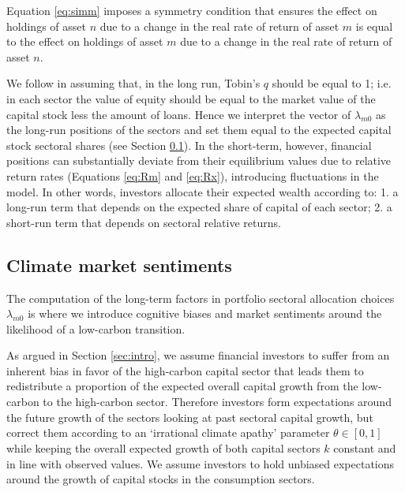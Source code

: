 \documentclass[authoryear]{article}
\begin{document}
Equation \ref{eq:simm} imposes a symmetry condition that ensures the effect on holdings of asset $n$ due to a change in the real rate of return of asset $m$ is equal to the effect on holdings of asset $m$ due to a change in the real rate of return of asset $n$.
			
We follow \citet{Tobin1969} in assuming that, in the long run, Tobin's $q$ should be equal to 1; i.e. in each sector the value of equity should be equal to the market value of the capital stock less the amount of loans. Hence we interpret the vector of $\lambda_{m0}$ as the long-run positions of the sectors and set them equal to the expected capital stock sectoral shares (see Section \ref{sec:exp}). In the short-term, however, financial positions can substantially deviate from their equilibrium values due to relative return rates (Equations \ref{eq:Rm} and \ref{eq:Rx}), introducing fluctuations in the model. In other words, investors allocate their expected wealth according to: 1. a long-run term that depends on the expected share of capital of each sector; 2. a short-run term that depends on sectoral relative returns. 


\subsection{Climate market sentiments}
\label{sec:exp}

The computation of the long-term factors in portfolio sectoral allocation choices $\lambda_{m0}$ is where we introduce cognitive biases and market sentiments around the likelihood of a low-carbon transition. 

As argued in Section \ref{sec:intro}, we assume financial investors to suffer from an inherent bias in favor of the high-carbon capital sector that leads them to redistribute a proportion of the expected overall capital growth from the low-carbon to the high-carbon sector. Therefore investors form expectations around the future growth of the sectors looking at past sectoral capital growth, but correct them according to an `irrational climate apathy' parameter $\theta\in[0,1]$ while keeping the overall expected growth of both capital sectors $\hat{k}$ constant and in line with observed values. We assume investors to hold unbiased expectations around the growth of capital stocks in the consumption sectors. 
\end{document}
